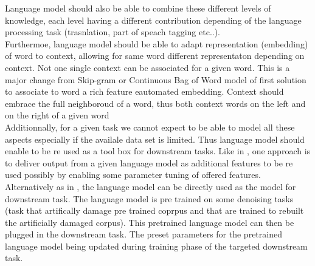 \documentclass[a4paper]{article}
\begin{document}
Language model should also be able to combine these different levels of knowledge, each level having a different contribution depending of  the language processing task (trasnlation, part of speach tagging etc..).\\

Furthermoe, language model should be able to adapt representation (embedding) of word to context, allowing for same word different representaton depending on context. Not one single context can be associated for a given word. This is a major change from Skip-gram or Continuous Bag of Word model of \cite{mikolov2013} first solution to associate to word a rich feature eautomated embedding. Context should embrace the full neighboroud of a word, thus both context words on the left and on the right of a given word\\

Additionnally, for a given task we cannot expect to be able to model all these aspects especially if the availale data set is limited. Thus language model should enable to be re used as a tool box for downstream tasks. Like in \cite{elmo2018}, one approach is to deliver output from a given language model as additional features to be re used possibly by enabling some parameter tuning of offered features. Alternatively as in \cite{bert2018}, the language model can be directly used as the model for downstream task. The language model is pre trained on some denoising tasks (task that artifically damage pre trained coprpus and that are trained to rebuilt the artificially damaged corpus). This pretrained language model can then be plugged in the downstream task. The preset parameters for the pretrained language model being updated during training phase of  the targeted downstream task.




\end{document}
